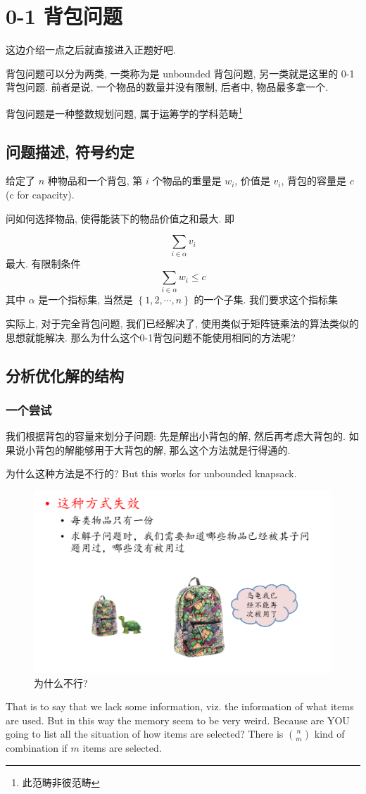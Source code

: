 \documentclass[a4paper, 10pt]{ctexart} %
\begin{document}
\section{0-1 背包问题}
这边介绍一点之后就直接进入正题好吧.

背包问题可以分为两类, 一类称为是 unbounded 背包问题, 另一类就是这里的 0-1 背包问题. 
前者是说, 一个物品的数量并没有限制, 后者中, 物品最多拿一个. 

背包问题是一种整数规划问题, 属于运筹学的学科范畴\footnote{此范畴非彼范畴}
\subsection{问题描述, 符号约定}
给定了 $n$ 种物品和一个背包, 第 $i$ 个物品的重量是 $w_{i}$, 价值是 $v_i$, 背包的容量是 $c$ (c for capacity).

问如何选择物品, 使得能装下的物品价值之和最大. 即

\[
\sum_{i \in \alpha} v_i 
\]
最大. 
有限制条件
\[
\sum_{i\in \alpha} w_i \le c
\]
其中 $\alpha$ 是一个指标集, 当然是 $\left\{1,2,\cdots ,n\right\}$ 的一个子集. 我们要求这个指标集

实际上, 对于完全背包问题, 我们已经解决了, 使用类似于矩阵链乘法的算法类似的思想就能解决.
那么为什么这个0-1背包问题不能使用相同的方法呢?
\subsection{分析优化解的结构}
\subsubsection{一个尝试}
我们根据背包的容量来划分子问题: 先是解出小背包的解, 然后再考虑大背包的. 如果说小背包的解能够用于大背包的解, 那么这个方法就是行得通的.

为什么这种方法是不行的? But this works for unbounded knapsack.
\begin{figure}[H]
    \centering
    \includegraphics[scale =0.5]{14.png}
    \caption{为什么不行?}
\end{figure}
That is to say that we lack some information,
viz. the information of what items are used. 
But in this way the memory seem to be very weird. Because
are YOU going to list all the situation of how items are selected?
There is $\binom{n}{m}$ kind of combination if $m$ items are selected.
\end{document}
